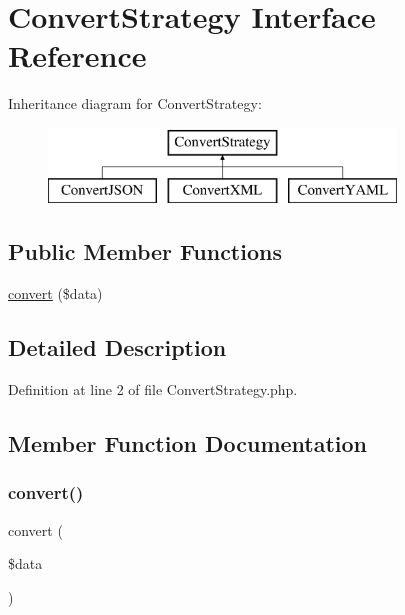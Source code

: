 \hypertarget{interface_convert_strategy}{}\section{Convert\+Strategy Interface Reference}
\label{interface_convert_strategy}
Inheritance diagram for Convert\+Strategy\+:\begin{figure}[H]
\begin{center}
\leavevmode
\includegraphics[height=2.000000cm]{interface_convert_strategy}
\end{center}
\end{figure}
\subsection*{Public Member Functions}
\begin{DoxyCompactItemize}
\item 
\hyperlink{interface_convert_strategy_a41444ea294bbd35a6c07ef4e9faeae10}{convert} (\$data)
\end{DoxyCompactItemize}


\subsection{Detailed Description}


Definition at line 2 of file Convert\+Strategy.\+php.



\subsection{Member Function Documentation}
\hypertarget{interface_convert_strategy_a41444ea294bbd35a6c07ef4e9faeae10}{}\label{interface_convert_strategy_a41444ea294bbd35a6c07ef4e9faeae10} 
\subsubsection{\texorpdfstring{convert()}{convert()}}
{\footnotesize\ttfamily convert (\begin{DoxyParamCaption}\item[{}]{\$data }\end{DoxyParamCaption})}

